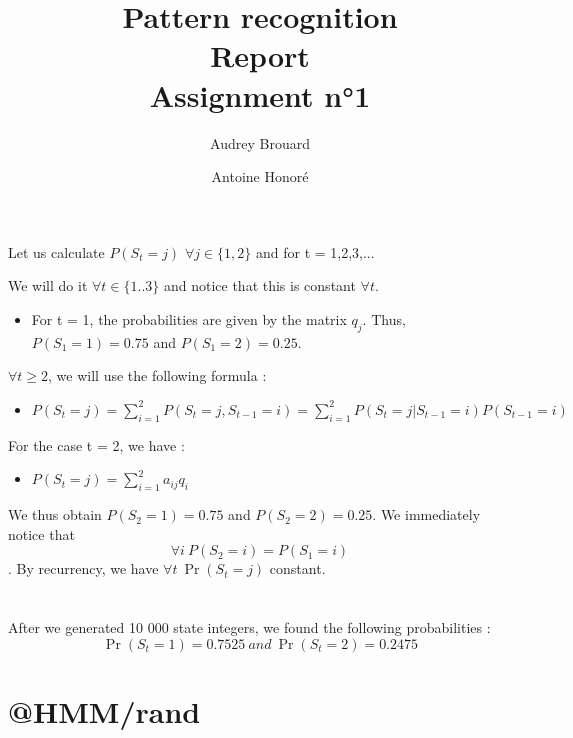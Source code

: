 \documentclass[a4paper]{report}
\title{Pattern recognition\\Report\\Assignment n°1}
\author{Audrey Brouard \and Antoine Honoré}
\begin{document}

\section{}

Let us calculate $P(S_{t}=j)$ $ \forall j\in\{1,2\} $ and for t = 1,2,3,...

We will do it $ \forall t\in\{1..3\} $ and notice that this is constant $\forall t$.

\begin{itemize}
  \item For t = 1, the probabilities are given by the matrix $q_{j}$. Thus, $P(S_{1}=1) = 0.75$ and $P(S_{1}=2) = 0.25$.\\
\end{itemize}
$\forall t\geq 2$, we will use the following formula :

	\begin{itemize}
	  \item $P(S_{t}=j) = \sum_{i=1}^{2} P({S_t}=j,S_{t-1}=i) = \sum_{i=1}^{2} P(S_t=j|S_{t-1}=i)P(S_{t-1}=i)$\\
	\end{itemize}

For the case t = 2, we have :
\begin{itemize}
  \item $P(S_t=j) = \sum_{i=1}^{2} a_{ij} q_i$
\end{itemize}

We thus obtain $P(S_{2}=1)=0.75$  and $P(S_{2}=2)=0.25$.
We immediately notice that \[\forall i~P(S_{2}=i) = P(S_{1}=i)\].
By recurrency, we have $\forall t~\Pr(S_{t}=j)$ constant.

\section{}
After we generated 10 000 state integers, we found the following probabilities :
\[\Pr(S_{t} = 1) = 0.7525~and~\Pr(S_{t} = 2) = 0.2475\]

\section{@HMM/rand}
\end{document}

